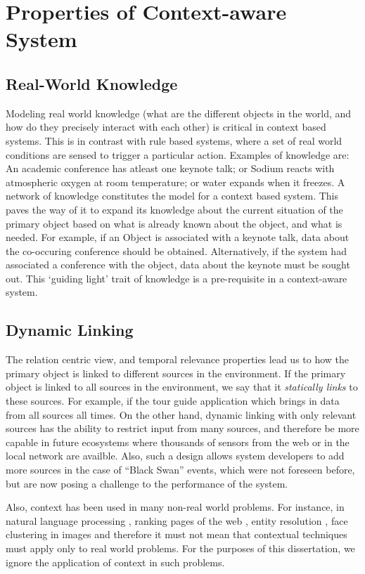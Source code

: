 \section{Properties of Context-aware System}

\subsection{Real-World Knowledge}
Modeling real world knowledge (what are the different objects in the world, and how do they precisely interact with each other) is critical in context based systems. This is in contrast with rule based systems, where a set of real world conditions are sensed to trigger a particular action. Examples of knowledge are: An academic conference has atleast one keynote talk; or Sodium reacts with atmospheric oxygen at room temperature; or water expands when it freezes. A network of knowledge constitutes the model for a context based system. This paves the way of it to expand its knowledge about the current situation of the primary object based on what is already known about the object, and what is needed. For example, if an Object is associated with a keynote talk, data about the co-occuring conference should be obtained. Alternatively, if the system had associated a conference with the object, data about the keynote must be sought out. This `guiding light' trait of knowledge is a pre-requisite in a context-aware system.

\subsection{Dynamic Linking}
The relation centric view, and temporal relevance properties lead us to how the primary object is linked to different sources in the environment. If the primary object is linked to all sources in the environment, we say that it \textit{statically links} to these sources. For example, if the tour guide application which brings in data from all sources all times. On the other hand, dynamic linking with only relevant sources has the ability to restrict input from many sources, and therefore be more capable in future ecosystems where thousands of sensors from the web or in the local network are availble. Also, such a design allows system developers to add more sources in the case of ``Black Swan'' events, which were not foreseen before, but are now posing a challenge to the performance of the system.

Also, context has been used in many non-real world problems. For instance, in natural language processing \cite{lee1990context}, ranking pages of the web \cite{page1999pagerank}, entity resolution \cite{chen2009exploiting}, face clustering in images \cite{zhang2013unified} and therefore it must not mean that contextual techniques must apply only to real world problems. For the purposes of this dissertation, we ignore the application of context in such problems.



